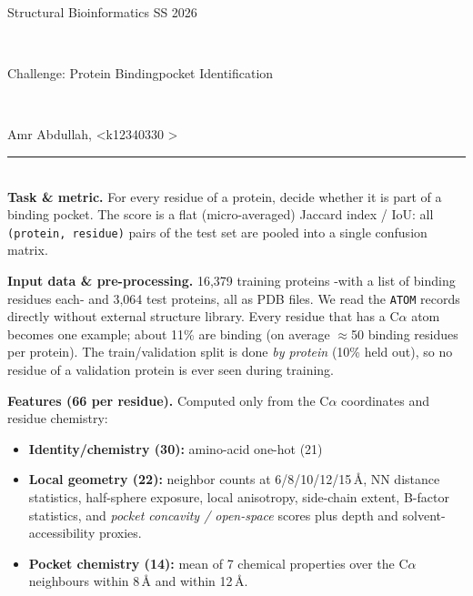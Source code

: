 \documentclass[12pt,a4paper,austrian]{article}
\begin{document}
\pagestyle{plain}

\thispagestyle{empty}
\noindent
\begin{minipage}[b][1.4cm]{1.0\textwidth}
\begin{center}
\begin{bf}
\begin{large} Structural Bioinformatics SS 2026\end{large} \\[0.15cm]
\begin{Large} Challenge: Protein Bindingpocket Identification\end{Large} \\[0.15cm]
\end{bf}
\begin{large}
Amr Abdullah, \textless k12340330 \textgreater\\
\end{large}
\end{center}
\end{minipage}

\noindent \rule[0.8em]{\textwidth}{0.12mm}\\[-0.5em]

\textbf{Task \& metric.} For every residue of a protein, decide whether it is
part of a binding pocket. The score is a flat (micro-averaged)
Jaccard index / IoU: all \texttt{(protein, residue)} pairs of the test set are
pooled into a single confusion matrix.

\textbf{Input data \& pre-processing.} 16{,}379 training proteins -with a list
of binding residues each- and 3{,}064 test proteins, all as PDB files. We read
the \texttt{ATOM} records directly without external structure library. Every
residue that has a C$\alpha$ atom becomes one example; about 11\% are binding
(on average $\approx$50 binding residues per protein). The train/validation
split is done \emph{by protein} (10\% held out), so no residue of a validation
protein is ever seen during training.

\textbf{Features (66 per residue).} Computed only from the C$\alpha$ coordinates
and residue chemistry:
\begin{itemize}
  \item \textbf{Identity/chemistry (30):} amino-acid one-hot (21)
  \item \textbf{Local geometry (22):} neighbor counts at 6/8/10/12/15\,\AA,
        NN distance statistics, half-sphere exposure, local
        anisotropy, side-chain extent, B-factor statistics, and
        \emph{pocket concavity / open-space} scores plus depth and
        solvent-accessibility proxies.
  \item \textbf{Pocket chemistry (14):} mean of 7 chemical properties over the
        C$\alpha$ neighbours within 8\,\AA{} and within 12\,\AA.
\end{itemize}
\end{document}
